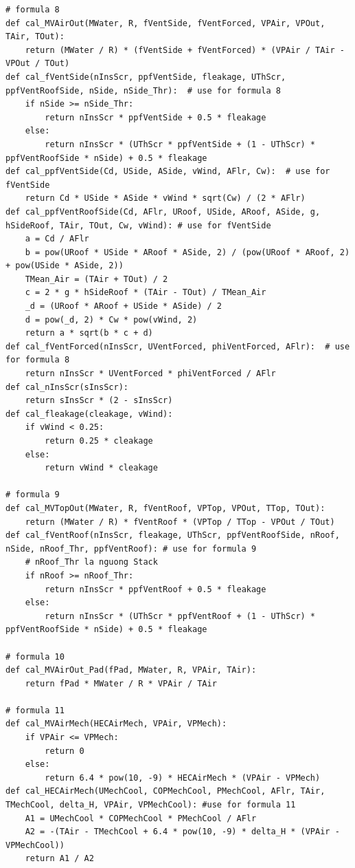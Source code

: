 \documentclass[a4paper]{article}
\begin{document}
\begin{verbatim}
# formula 8
def cal_MVAirOut(MWater, R, fVentSide, fVentForced, VPAir, VPOut, TAir, TOut):
    return (MWater / R) * (fVentSide + fVentForced) * (VPAir / TAir - VPOut / TOut)
def cal_fVentSide(nInsScr, ppfVentSide, fleakage, UThScr, ppfVentRoofSide, nSide, nSide_Thr):  # use for formula 8
    if nSide >= nSide_Thr:
        return nInsScr * ppfVentSide + 0.5 * fleakage
    else:
        return nInsScr * (UThScr * ppfVentSide + (1 - UThScr) * ppfVentRoofSide * nSide) + 0.5 * fleakage
def cal_ppfVentSide(Cd, USide, ASide, vWind, AFlr, Cw):  # use for fVentSide
    return Cd * USide * ASide * vWind * sqrt(Cw) / (2 * AFlr)
def cal_ppfVentRoofSide(Cd, AFlr, URoof, USide, ARoof, ASide, g, hSideRoof, TAir, TOut, Cw, vWind): # use for fVentSide
    a = Cd / AFlr
    b = pow(URoof * USide * ARoof * ASide, 2) / (pow(URoof * ARoof, 2) + pow(USide * ASide, 2))
    TMean_Air = (TAir + TOut) / 2
    c = 2 * g * hSideRoof * (TAir - TOut) / TMean_Air
    _d = (URoof * ARoof + USide * ASide) / 2
    d = pow(_d, 2) * Cw * pow(vWind, 2)
    return a * sqrt(b * c + d)
def cal_fVentForced(nInsScr, UVentForced, phiVentForced, AFlr):  # use for formula 8
    return nInsScr * UVentForced * phiVentForced / AFlr
def cal_nInsScr(sInsScr):
    return sInsScr * (2 - sInsScr)
def cal_fleakage(cleakage, vWind):
    if vWind < 0.25:
        return 0.25 * cleakage
    else:
        return vWind * cleakage

# formula 9
def cal_MVTopOut(MWater, R, fVentRoof, VPTop, VPOut, TTop, TOut):
    return (MWater / R) * fVentRoof * (VPTop / TTop - VPOut / TOut)
def cal_fVentRoof(nInsScr, fleakage, UThScr, ppfVentRoofSide, nRoof, nSide, nRoof_Thr, ppfVentRoof): # use for formula 9
    # nRoof_Thr la nguong Stack
    if nRoof >= nRoof_Thr:
        return nInsScr * ppfVentRoof + 0.5 * fleakage
    else:
        return nInsScr * (UThScr * ppfVentRoof + (1 - UThScr) * ppfVentRoofSide * nSide) + 0.5 * fleakage

# formula 10
def cal_MVAirOut_Pad(fPad, MWater, R, VPAir, TAir):
    return fPad * MWater / R * VPAir / TAir

# formula 11
def cal_MVAirMech(HECAirMech, VPAir, VPMech):
    if VPAir <= VPMech:
        return 0
    else:
        return 6.4 * pow(10, -9) * HECAirMech * (VPAir - VPMech)
def cal_HECAirMech(UMechCool, COPMechCool, PMechCool, AFlr, TAir, TMechCool, delta_H, VPAir, VPMechCool): #use for formula 11
    A1 = UMechCool * COPMechCool * PMechCool / AFlr
    A2 = -(TAir - TMechCool + 6.4 * pow(10, -9) * delta_H * (VPAir -VPMechCool))
    return A1 / A2


\end{verbatim}
\end{document}
